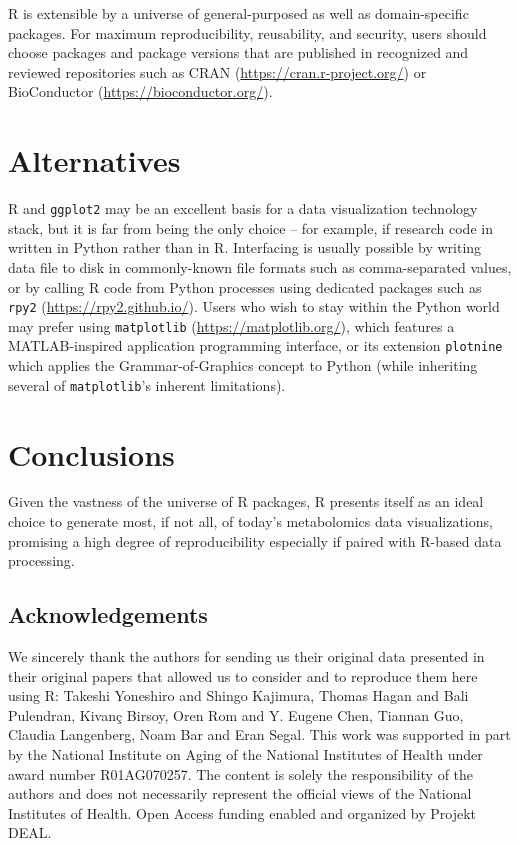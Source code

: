 \documentclass[AMA,LATO1COL]{WileyNJD-v2}
\begin{document}
R is extensible by a universe of general-purposed as well as domain-specific
packages. For maximum reproducibility, reusability, and security, users should
choose packages and package versions that are published in recognized and
reviewed repositories such as CRAN (\url{https://cran.r-project.org/}) or
BioConductor (\url{https://bioconductor.org/}).

\section{Alternatives}

R and \texttt{ggplot2} may be an excellent basis for a data visualization
technology stack, but it is far from being the only choice -- for example, if
research code in written in Python rather than in R. Interfacing is usually
possible by writing data file to disk in commonly-known file formats such as
comma-separated values, or by calling R code from Python processes using
dedicated packages such as \texttt{rpy2} (\url{https://rpy2.github.io/}). Users
who wish to stay within the Python world may prefer using \texttt{matplotlib}
(\url{https://matplotlib.org/}), which features a MATLAB-inspired application
programming interface, or its extension \texttt{plotnine} which applies the
Grammar-of-Graphics concept to Python (while inheriting several of
\texttt{matplotlib}'s inherent limitations).

\section{Conclusions}

Given the vastness of the universe of R packages, R presents itself as an ideal
choice to generate most, if not all, of today's metabolomics data
visualizations, promising a high degree of reproducibility especially if paired
with R-based data processing.

\subsection*{Acknowledgements}

We sincerely thank the authors for sending us their original data presented in
their original papers that allowed us to consider and to reproduce them here
using R: Takeshi Yoneshiro and Shingo Kajimura, Thomas Hagan and Bali Pulendran,
Kivanç Birsoy, Oren Rom and Y. Eugene Chen, Tiannan Guo, Claudia Langenberg,
Noam Bar and Eran Segal. This work was supported in part by the National
Institute on Aging of the National Institutes of Health under award number
R01AG070257. The content is solely the responsibility of the authors and does
not necessarily represent the official views of the National Institutes of
Health. Open Access funding enabled and organized by Projekt DEAL.
\end{document}
